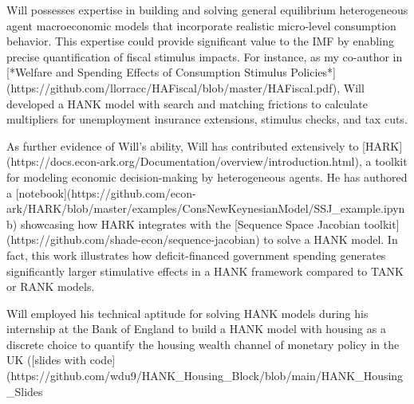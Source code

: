 \documentclass[\econtexRoot/Letter]{subfiles}
\begin{document}
\notinsubfile{\renewcommand{\econtexRoot}{.}}


Will possesses expertise in building and solving general equilibrium heterogeneous agent macroeconomic models that incorporate realistic micro-level consumption behavior. This expertise could provide significant value to the IMF by enabling precise quantification of fiscal stimulus impacts. For instance, as my co-author in [*Welfare and Spending Effects of Consumption Stimulus Policies*](https://github.com/llorracc/HAFiscal/blob/master/HAFiscal.pdf), Will developed a HANK model with search and matching frictions to calculate multipliers for unemployment insurance extensions, stimulus checks, and tax cuts.

As further evidence of Will's ability, Will has contributed extensively to [HARK](https://docs.econ-ark.org/Documentation/overview/introduction.html), a toolkit for modeling economic decision-making by heterogeneous agents. He has authored a [notebook](https://github.com/econ-ark/HARK/blob/master/examples/ConsNewKeynesianModel/SSJ_example.ipynb) showcasing how HARK integrates with the [Sequence Space Jacobian toolkit](https://github.com/shade-econ/sequence-jacobian) to solve a HANK model. In fact, this work illustrates how deficit-financed government spending generates significantly larger stimulative effects in a HANK framework compared to TANK or RANK models.

Will employed his technical aptitude for solving HANK models during his internship at the Bank of England to build a HANK model with housing as a discrete choice to quantify the housing wealth channel of monetary policy in the UK ([slides with code](https://github.com/wdu9/HANK_Housing_Block/blob/main/HANK_Housing_Slides%
\end{document}
